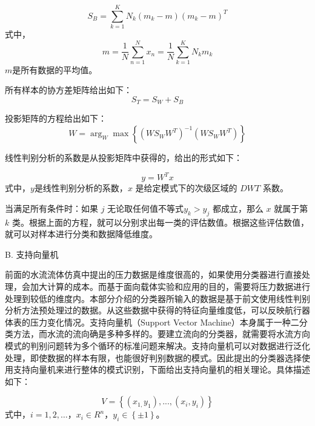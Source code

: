\begin{equation}
{S_B} = \sum\limits_{k = 1}^K {{N_k}\left( {{m_k} - m} \right){{\left( {{m_k} - m} \right)}^T}}
\label{eq:chap3:20}
\end{equation}
式中，
\begin{equation*}
m = \frac{1}{N}\sum\limits_{n = 1}^N {{x_n}}  = \frac{1}{N}\sum\limits_{k = 1}^K {{N_k}{m_k}}
\end{equation*}
$m$是所有数据的平均值。

所有样本的协方差矩阵给出如下：
 \begin{equation}
{S_T} = {S_W} + {S_B}
\label{eq:chap3:21}
\end{equation}

投影矩阵的方程给出如下：
\begin{equation}
W = {\arg _W}\max \left\{ {{{\left( {W{S_W}{W^T}} \right)}^{ - 1}}\left( {W{S_W}{W^T}} \right)} \right\}
\label{eq:chap3:22}
\end{equation}

线性判别分析的系数是从投影矩阵中获得的，给出的形式如下：

\begin{equation}
y = {W^T}x
\label{eq:chap3:23}
\end{equation}
式中，$y$是线性判别分析的系数，$x$ 是给定模式下的次级区域的 $DWT$ 系数。

当满足所有条件时：如果 $j$ 无论取任何值不等式$y_k>y_j$ 都成立，那么 $x$ 就属于第 $k$ 类。根据上面的方程，就可以分别求出每一类的评估数值。根据这些评估数值，就可以对样本进行分类和数据降低维度。

B. {支持向量机 }

前面的水流流体仿真中提出的压力数据是维度很高的，如果使用分类器进行直接处理，会加大计算的成本。而基于面向载体实验和应用的目的，需要将压力数据进行处理到较低的维度内。本部分介绍的分类器所输入的数据是基于前文使用线性判别分析方法预处理过的数据。从这些数据中获得的特征向量维度低，可以反映航行器体表的压力变化情况。支持向量机（Support Vector Machine）本身属于一种二分类方法，而水流的流向确是多种多样的。要建立流向的分类器，就需要将水流方向模式的判别问题转为多个循环的标准问题来解决。支持向量机可以对数据进行泛化处理，即使数据的样本有限，也能很好判别数据的模式。因此提出的分类器选择使用支持向量机来进行整体的模式识别，下面给出支持向量机的相关理论。具体描述如下：

\begin{equation}
V = \left\{ {\left( {{x_{1,}}{y_1}} \right),...,\left( {{x_i},{y_i}} \right)} \right\}
\label{eq:chap3:24}
\end{equation}
式中，$i=1,2,\ldots$，${x_i} \in {R^n}$，${y_i} \in \left\{ { \pm 1} \right\}$。

